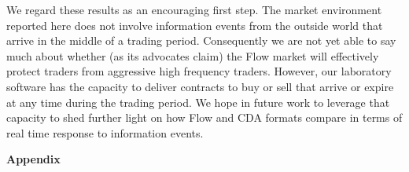\documentclass[12pt]{article}
\begin{document}
We regard these results as an encouraging first step.
The market environment reported here 
does not involve information events from the outside world that arrive 
in the middle of a trading period.
Consequently we are not yet able to say much about whether 
(as its advocates claim)
the Flow market will effectively protect traders from aggressive high frequency traders. 
However, our laboratory software has the capacity to deliver contracts to buy or sell that arrive or expire at any time during the trading period.
We hope in future work to leverage that capacity to shed further light on how Flow and CDA formats compare in terms of real time response to information events.










\pagebreak
\begin{singlespace}



\pagebreak
\end{singlespace}
\clearpage


\begin{singlespace}
\appendix
\setcounter{page}{1}
\begin{center}
    \huge \textbf{Appendix}
    
\end{center}



% 
\end{singlespace}
\end{document}
